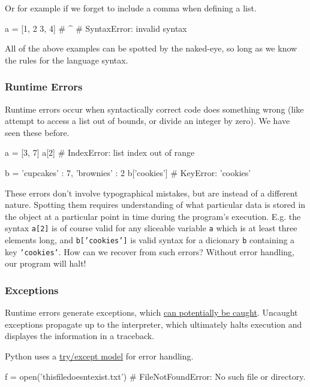 \documentclass[12pt,letterpaper,twoside]{article}
\begin{document}
\begin{enumerate}
Or for example if we forget to include a comma when defining a list.
\begin{python}
a = [1, 2 3, 4]
#        ^
# SyntaxError: invalid syntax
\end{python}

All of the above examples can be spotted by the naked-eye, so long as we know the rules for the language syntax.

\subsubsection{Runtime Errors}

Runtime errors occur when syntactically correct code does something
wrong (like attempt to access a list out of bounds, or divide an integer by zero).
We have seen these before.

\begin{python}
a = [3, 7]
a[2]          # IndexError: list index out of range

b = {'cupcakes' : 7, 'brownies' : 2}
b['cookies']  # KeyError: 'cookies'
\end{python}

These errors don't involve typographical mistakes, but are instead of a different nature.
Spotting them requires understanding of what particular data is stored in the object
at a particular point in time during the program's execution. E.g. 
the syntax \texttt{a[2]} is of course valid for any sliceable variable \texttt{a} which is at least three elements long,
and \texttt{b['cookies']} is valid syntax for a dicionary \texttt{b} containing a key \texttt{'cookies'}.
How can we recover from such errors? Without error handling, our program will halt!

\subsubsection{Exceptions}
Runtime errors generate exceptions, which \href{https://en.wikipedia.org/wiki/Exception_handling}{can potentially be caught}. 
Uncaught exceptions propagate up to the interpreter, which
ultimately halts execution and displayes the information in a traceback.

Python uses a \href{https://docs.python.org/3/tutorial/errors.html#handling-exceptions}{try/except model} 
for error handling.

\begin{python}
f = open('thisfiledoesntexist.txt')   # FileNotFoundError: No such file or directory.
\end{python}


\end{enumerate}
\end{document}
